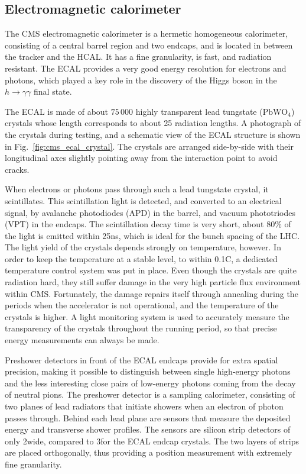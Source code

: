\subsection{Electromagnetic calorimeter \label{sec:cms_ecal}}

The CMS electromagnetic calorimeter is a hermetic homogeneous calorimeter, consisting of a central
barrel region and two endcaps, and is located in between the tracker and the HCAL. 
It has a fine granularity, is fast, and radiation resistant.
The ECAL provides a very good energy resolution for electrons and photons, which played a key role
in the discovery of the Higgs boson in the $h\rightarrow\gamma\gamma$ final state. 

The ECAL is made of about $75\,000$ highly transparent lead tungstate ($\text{PbWO}_\text{4}$)
crystals whose length corresponds to about 25 radiation lengths. A photograph of the crystals
during testing, and a schematic view of the ECAL structure is shown in
Fig.~\ref{fig:cms_ecal_crystal}. The crystals are arranged side-by-side with their longitudinal axes
slightly pointing away from the interaction point to avoid cracks.

When electrons or photons pass through such a lead tungstate crystal, it scintillates. 
This scintillation light is detected, and converted to an electrical signal, by avalanche
photodiodes (APD) in the barrel, and vacuum phototriodes (VPT) in the endcaps.
The scintillation decay time is very short, about 80\% of the light is emitted within 25\unit{ns},
which is ideal for the bunch spacing of the LHC. 
The light yield of the crystals depends strongly on temperature, however. In order to keep the
temperature at a stable level, to within 0.1\de C, a dedicated temperature control system was put in
place.
Even though the crystals are quite radiation hard, they still suffer damage in the very high
particle flux environment within CMS. Fortunately, the damage repairs itself through annealing
during the periods when the accelerator is not operational, and the temperature of the crystals is
higher. A light monitoring system is used to accurately measure the transparency of the crystals
throughout the running period, so that precise energy measurements can always be made. 

Preshower detectors in front of the ECAL endcaps provide for extra spatial precision, making it
possible to distinguish between single high-energy photons and the less interesting close pairs of
low-energy photons coming from the decay of neutral pions.
The preshower detector is a sampling calorimeter, consisting of two planes of lead radiators that
initiate showers when an electron of photon passes through. Behind each lead plane are sensors that
measure the deposited energy and transverse shower profiles. 
The sensors are silicon strip detectors of only 2\mm wide, compared to 3\cm for the ECAL endcap
crystals. The two layers of strips are placed orthogonally, thus providing a position
measurement with extremely fine granularity. 


